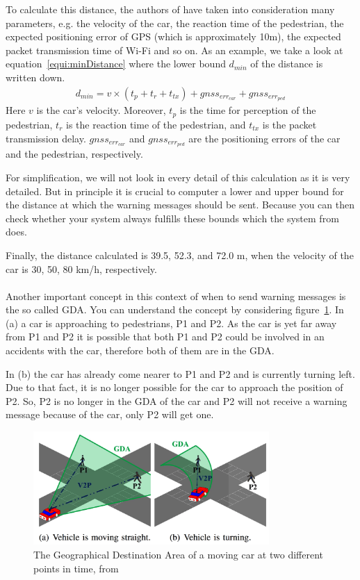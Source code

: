 \documentclass[]{ccs-thesis}
\begin{document}
To calculate this distance, the authors of \cite{v2pcomm} have taken into consideration many parameters, e.g. the velocity of the car, the reaction time of the pedestrian, the expected positioning error of GPS (which is approximately 10m), the expected packet transmission time of Wi-Fi and so on. As an example, we take a look at equation~\ref{equi:minDistance} where the lower bound $d_{min}$ of the distance is written down.
\begin{align}
d_{min}=v \times (t_p+t_r+t_{tx})+gnss_{err_{car}}+gnss_{err_{ped}}\label{equi:minDistance}
\end{align}
Here $v$ is the car's velocity. Moreover, $t_p$ is the time for perception of the pedestrian, $t_r$ is the reaction time of the pedestrian, and $t_{tx}$ is the packet transmission delay. $gnss_{err_{car}}$ and $gnss_{err_{ped}}$ are the positioning errors of the car and the pedestrian, respectively.

For simplification, we will not look in every detail of this calculation as it is very detailed. But in principle it is crucial to computer a lower and upper bound for the distance at which the warning messages should be sent. Because you can then check whether your system always fulfills these bounds which the system from \cite{v2pcomm} does.

Finally, the distance calculated is 39.5, 52.3, and 72.0 m, when the velocity of the car is 30, 50, 80 km/h, respectively. \cite{v2pcomm}
\\\\
Another important concept in this context of when to send warning messages is the so called \ac{GDA}. You can understand the concept by considering figure~\ref{fig:gda}. In (a) a car is approaching to pedestrians, P1 and P2. As the car is yet far away from P1 and P2 it is possible that both P1 and P2 could be involved in an accidents with the car, therefore both of them are in the \ac{GDA}.

In (b) the car has already come nearer to P1 and P2 and is currently turning left. Due to that fact, it is no longer possible for the car to approach the position of P2. So, P2 is no longer in the \ac{GDA} of the car and P2 will not receive a warning message because of the car, only P2 will get one.

\begin{figure}[h]
	\centering
	\includegraphics[width=0.8\textwidth]{figures/5_gda}
	\caption{The Geographical Destination Area of a moving car at two different points in time, from \cite{v2pcomm}}%
	\label{fig:gda}%
\end{figure}
\end{document}
